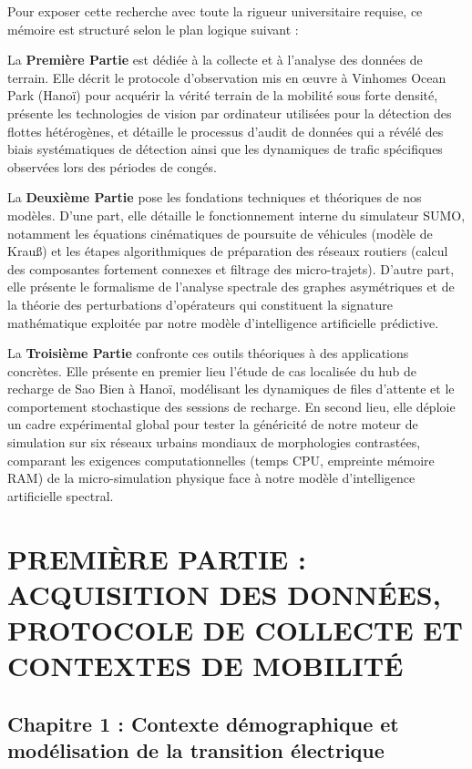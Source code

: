 \documentclass[10pt, a4paper]{article}
\begin{document}
Pour exposer cette recherche avec toute la rigueur universitaire
requise, ce mémoire est structuré selon le plan logique suivant :

La \textbf{Première Partie} est dédiée à la collecte et à l'analyse des
données de terrain. Elle décrit le protocole d'observation mis en œuvre
à Vinhomes Ocean Park (Hanoï) pour acquérir la vérité terrain de la
mobilité sous forte densité, présente les technologies de vision par
ordinateur utilisées pour la détection des flottes hétérogènes, et
détaille le processus d'audit de données qui a révélé des biais
systématiques de détection ainsi que les dynamiques de trafic
spécifiques observées lors des périodes de congés.

La \textbf{Deuxième Partie} pose les fondations techniques et théoriques
de nos modèles. D'une part, elle détaille le fonctionnement interne du
simulateur SUMO, notamment les équations cinématiques de poursuite de
véhicules (modèle de Krauß) et les étapes algorithmiques de préparation
des réseaux routiers (calcul des composantes fortement connexes et
filtrage des micro-trajets). D'autre part, elle présente le formalisme
de l'analyse spectrale des graphes asymétriques et de la théorie des
perturbations d'opérateurs qui constituent la signature mathématique
exploitée par notre modèle d'intelligence artificielle prédictive.

La \textbf{Troisième Partie} confronte ces outils théoriques à des
applications concrètes. Elle présente en premier lieu l'étude de cas
localisée du hub de recharge de Sao Bien à Hanoï, modélisant les
dynamiques de files d'attente et le comportement stochastique des
sessions de recharge. En second lieu, elle déploie un cadre expérimental
global pour tester la généricité de notre moteur de simulation sur six
réseaux urbains mondiaux de morphologies contrastées, comparant les
exigences computationnelles (temps CPU, empreinte mémoire RAM) de la
micro-simulation physique face à notre modèle d'intelligence
artificielle spectral.

\newpage

\section{PREMIÈRE PARTIE : ACQUISITION DES DONNÉES, PROTOCOLE DE
COLLECTE ET CONTEXTES DE
MOBILITÉ}\label{premiuxe8re-partie-acquisition-des-donnuxe9es-protocole-de-collecte-et-contextes-de-mobilituxe9}

\subsection{Chapitre 1 : Contexte démographique et modélisation de la
transition
électrique}\label{chapitre-1-contexte-duxe9mographique-et-moduxe9lisation-de-la-transition-uxe9lectrique}
\end{document}
